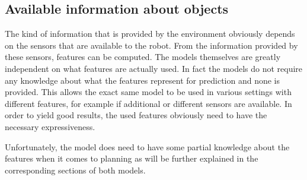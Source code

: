 %

\subsection{Available information about objects}

The kind of information that is provided by the environment obviously depends on the sensors that are available to the robot. From the information provided by these sensors, features can be computed. The models themselves are greatly independent on what features are actually used. In fact the models do not require any knowledge about what the features represent for prediction and none is provided. This allows the exact same model to be used in various settings with different features, for example if additional or different sensors are available. In order to yield good results, the used features obviously need to have the necessary expressiveness.

Unfortunately, the model does need to have some partial knowledge about the features when it comes to planning as will be further explained in the corresponding sections of both models.

